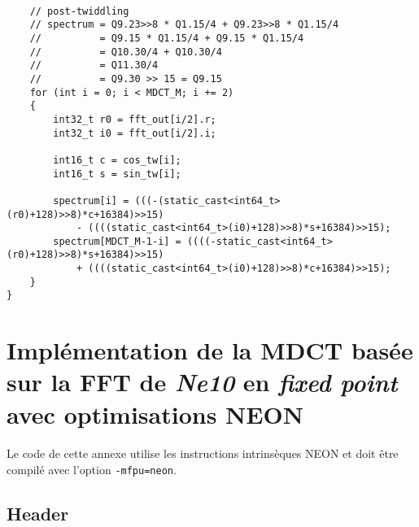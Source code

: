 \documentclass{article}
\begin{document}
\begin{lstlisting}

    // post-twiddling
    // spectrum = Q9.23>>8 * Q1.15/4 + Q9.23>>8 * Q1.15/4
    //          = Q9.15 * Q1.15/4 + Q9.15 * Q1.15/4
    //          = Q10.30/4 + Q10.30/4
    //          = Q11.30/4
    //          = Q9.30 >> 15 = Q9.15
    for (int i = 0; i < MDCT_M; i += 2)
    {
        int32_t r0 = fft_out[i/2].r;
        int32_t i0 = fft_out[i/2].i;

        int16_t c = cos_tw[i];
        int16_t s = sin_tw[i];

        spectrum[i] = (((-(static_cast<int64_t>(r0)+128)>>8)*c+16384)>>15) 
            - ((((static_cast<int64_t>(i0)+128)>>8)*s+16384)>>15);
        spectrum[MDCT_M-1-i] = ((((-static_cast<int64_t>(r0)+128)>>8)*s+16384)>>15) 
            + ((((static_cast<int64_t>(i0)+128)>>8)*c+16384)>>15);
    }
}
\end{lstlisting}




\newpage
\section{Implémentation de la MDCT basée sur la FFT de \emph{Ne10} en \emph{fixed point} avec optimisations NEON}\label{app:mdct_ne10_i32_neon}
\paragraph{}
Le code de cette annexe utilise les instructions intrinsèques NEON et doit être compilé avec l'option \texttt{-mfpu=neon}.

\subsection{Header}\label{app:mdct_ne10_i32_neon_header}
\end{document}
